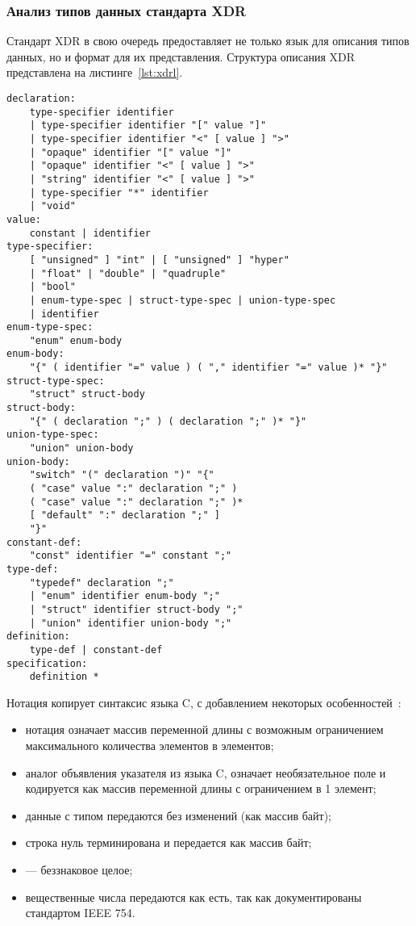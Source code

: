 \subsubsection{Анализ типов данных стандарта XDR}

Стандарт XDR в свою очередь предоставляет не только язык для описания типов
данных, но и формат для их представления. Структура описания XDR представлена
на листинге~\ref{lst:xdrl}.

\clearpage

\begin{lstlisting}[caption={Структура XDR}, label={lst:xdrl}]
declaration:
    type-specifier identifier
    | type-specifier identifier "[" value "]"
    | type-specifier identifier "<" [ value ] ">"
    | "opaque" identifier "[" value "]"
    | "opaque" identifier "<" [ value ] ">"
    | "string" identifier "<" [ value ] ">"
    | type-specifier "*" identifier
    | "void"
value:
    constant | identifier
type-specifier:
    [ "unsigned" ] "int" | [ "unsigned" ] "hyper"
    | "float" | "double" | "quadruple"
    | "bool"
    | enum-type-spec | struct-type-spec | union-type-spec
    | identifier
enum-type-spec:
    "enum" enum-body
enum-body:
    "{" ( identifier "=" value ) ( "," identifier "=" value )* "}"
struct-type-spec:
    "struct" struct-body
struct-body:
    "{" ( declaration ";" ) ( declaration ";" )* "}"
union-type-spec:
    "union" union-body
union-body:
    "switch" "(" declaration ")" "{"
    ( "case" value ":" declaration ";" )
    ( "case" value ":" declaration ";" )*
    [ "default" ":" declaration ";" ]
    "}"
constant-def:
    "const" identifier "=" constant ";"
type-def:
    "typedef" declaration ";"
    | "enum" identifier enum-body ";"
    | "struct" identifier struct-body ";"
    | "union" identifier union-body ";"
definition:
    type-def | constant-def
specification:
    definition *
\end{lstlisting}

\clearpage

Нотация копирует синтаксис языка C, с добавлением некоторых
особенностей~\cite{rfc4506}:
\begin{itemize}
    \item нотация  означает массив переменной длины с
          возможным ограничением максимального количества элементов в
           элементов;
    \item аналог объявления указателя из языка C, означает необязательное поле
          и кодируется как массив переменной длины с ограничением в 1 элемент;
    \item данные с типом  передаются без изменений (как массив
          байт);
    \item строка  нуль терминирована и передается как массив байт;
    \item {} --- беззнаковое целое;
    \item вещественные числа передаются как есть, так как документированы
          стандартом IEEE 754.
\end{itemize}

